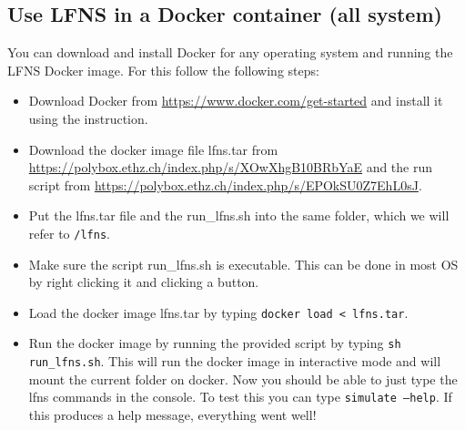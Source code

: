 \documentclass[11pt]{article} %
\begin{document}
\subsection{Use LFNS in a Docker container (all system)}
You can download and install Docker for any operating system and running the LFNS Docker image. For this follow the following steps: 
\begin{itemize}
	\item Download Docker from \href{https://www.docker.com/get-started}{https://www.docker.com/get-started} and install it using the instruction. 
	\item Download the docker image file lfns.tar from \href{ https://polybox.ethz.ch/index.php/s/XOwXhgB10BRbYaE}{ https://polybox.ethz.ch/index.php/s/XOwXhgB10BRbYaE} and the run script from \href{https://polybox.ethz.ch/index.php/s/EPOkSU0Z7EhL0sJ}{https://polybox.ethz.ch/index.php/s/EPOkSU0Z7EhL0sJ}. 
	\item Put the lfns.tar file and the run\_lfns.sh into the same folder, which we will refer to \texttt{/lfns}. 
	\item Make sure the script run\_lfns.sh is executable. This can be done in most OS by right clicking it and clicking a button. 
	\item Load the docker image lfns.tar by typing \texttt{docker load < lfns.tar}. 
	\item Run the docker image by running the provided script by typing \texttt{sh run\_lfns.sh}. This will run the docker image in interactive mode and will mount the current folder on docker. Now you should be able to just type the lfns commands in the console. To test this you can type \texttt{simulate --help}. If this produces a help message, everything went well!
\end{itemize}
\end{document}

